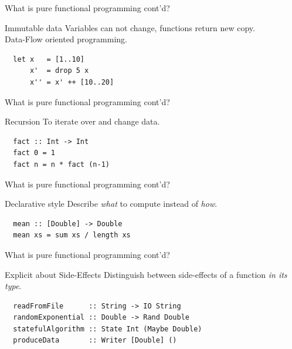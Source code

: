 \documentclass{beamer} %
\begin{document}
\begin{frame}[fragile]{What is pure functional programming cont'd?}
  \begin{block}{Immutable data}
 	Variables can not change, functions return new copy. \\ Data-Flow oriented programming.
  \end{block}
  
  \begin{block}{}
  \begin{verbatim}
  let x   = [1..10]
      x'  = drop 5 x
      x'' = x' ++ [10..20] 
  \end{verbatim}
  \end{block}
\end{frame}
 
\begin{frame}[fragile]{What is pure functional programming cont'd?}
  \begin{block}{Recursion}
 	To iterate over and change data. 
  \end{block}
  
  \begin{block}{}
  \begin{verbatim}
  fact :: Int -> Int
  fact 0 = 1
  fact n = n * fact (n-1)
  \end{verbatim}
  \end{block}
\end{frame}
 
\begin{frame}[fragile]{What is pure functional programming cont'd?}
  \begin{block}{Declarative style}
  	Describe \textit{what} to compute instead of \textit{how}.
  \end{block}
  
  \begin{block}{}
  \begin{verbatim}
  mean :: [Double] -> Double
  mean xs = sum xs / length xs
  \end{verbatim}
  \end{block}
\end{frame}
 
\begin{frame}[fragile]{What is pure functional programming cont'd?}
  \begin{block}{Explicit about Side-Effects}
  	Distinguish between side-effects of a function \textit{in its type}.
  \end{block}
  
  \begin{block}{}
  \begin{verbatim}
  readFromFile      :: String -> IO String
  randomExponential :: Double -> Rand Double
  statefulAlgorithm :: State Int (Maybe Double)
  produceData       :: Writer [Double] ()
  \end{verbatim}
  \end{block}
\end{frame}
\end{document}
